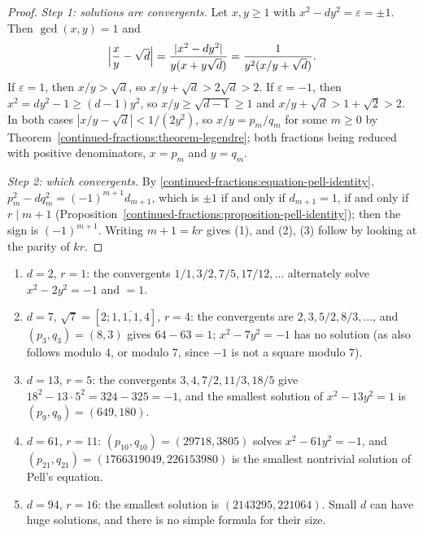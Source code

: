 \begin{proof}
\emph{Step 1: solutions are convergents.} Let $x, y \geq 1$ with $x^2 - dy^2 = \varepsilon = \pm 1$. Then $\gcd(x, y) = 1$ and
\[
\Bigl|\frac xy - \sqrt d\Bigr| = \frac{|x^2 - dy^2|}{y(x + y\sqrt d)} = \frac{1}{y^2(x/y + \sqrt d)}.
\]
If $\varepsilon = 1$, then $x/y > \sqrt d$, so $x/y + \sqrt d > 2\sqrt d > 2$. If $\varepsilon = -1$, then $x^2 = dy^2 - 1 \geq (d - 1)y^2$, so $x/y \geq \sqrt{d - 1} \geq 1$ and
$x/y + \sqrt d > 1 + \sqrt2 > 2$. In both cases $|x/y - \sqrt d| < 1/(2y^2)$, so $x/y = p_m/q_m$ for some $m \geq 0$ by Theorem~\ref{continued-fractions:theorem-legendre}; both fractions being reduced
with positive denominators, $x = p_m$ and $y = q_m$.

\emph{Step 2: which convergents.} By \eqref{continued-fractions:equation-pell-identity}, $p_m^2 - dq_m^2 = (-1)^{m+1}d_{m+1}$, which is $\pm 1$ if and only if $d_{m+1} = 1$, if and only if
$r \mid m + 1$ (Proposition~\ref{continued-fractions:proposition-pell-identity}); then the sign is $(-1)^{m+1}$. Writing $m + 1 = kr$ gives (1), and (2), (3) follow by looking at the parity of $kr$.
\end{proof}

\begin{example}\label{continued-fractions:example-pell}
\begin{enumerate}
\item $d = 2$, $r = 1$: the convergents $1/1, 3/2, 7/5, 17/12, \ldots$ alternately solve $x^2 - 2y^2 = -1$ and $= 1$.
\item $d = 7$, $\sqrt7 = [2; \overline{1, 1, 1, 4}]$, $r = 4$: the convergents are $2, 3, 5/2, 8/3, \ldots$, and $(p_3, q_3) = (8, 3)$ gives $64 - 63 = 1$; $x^2 - 7y^2 = -1$ has no solution (as
also follows modulo $4$, or modulo $7$, since $-1$ is not a square modulo $7$).
\item $d = 13$, $r = 5$: the convergents $3, 4, 7/2, 11/3, 18/5$ give $18^2 - 13 \cdot 5^2 = 324 - 325 = -1$, and the smallest solution of $x^2 - 13y^2 = 1$ is $(p_9, q_9) = (649, 180)$.
\item $d = 61$, $r = 11$: $(p_{10}, q_{10}) = (29718, 3805)$ solves $x^2 - 61y^2 = -1$, and $(p_{21}, q_{21}) = (1766319049, 226153980)$ is the smallest nontrivial solution of Pell's equation.
\item $d = 94$, $r = 16$: the smallest solution is $(2143295, 221064)$. Small $d$ can have huge solutions, and there is no simple formula for their size.
\end{enumerate}
\end{example}

